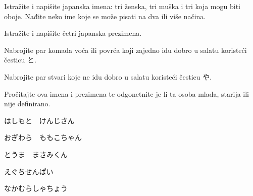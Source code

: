 
\author{Tomislav Mamić, Željka Ludošan}

	
	\begin{mondai}{}
		\item Istražite i napišite japanska imena: tri ženska, tri muška i tri koja mogu biti oboje. Nađite neko ime koje se može pisati na dva ili više načina.
		\item Istražite i napišite četri japanska prezimena.
		\item Nabrojite par komada voća ili povrća koji zajedno idu dobro u salatu koristeći česticu と.
		\item Nabrojite par stvari koje ne idu dobro u salatu koristeći česticu や.
	\end{mondai}
	
	\begin{mondai}{Pročitajte ova imena i prezimena te odgonetnite je li ta osoba mlađa, starija ili nije definirano.}
		\item はしもと　けんじさん
		\item おぎわら　ももこちゃん
		\item とうま　まさみくん
		\item えぐちせんぱい
		\item なかむらしゃちょう
	\end{mondai}
	
